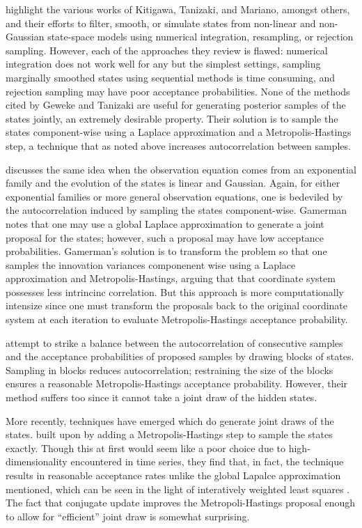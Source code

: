 \documentclass[11pt]{article}
\begin{document}
\cite{geweke-tanizaki-2001} highlight the various works of Kitigawa, Tanizaki,
and Mariano, amongst others, and their efforts to filter, smooth, or simulate
states from non-linear and non-Gaussian state-space models using numerical
integration, resampling, or rejection sampling.  However, each of the approaches
they review is flawed: numerical integration does not work well for any but the
simplest settings, sampling marginally smoothed states using sequential methods
is time consuming, and rejection sampling may have poor acceptance
probabilities.  None of the methods cited by Geweke and Tanizaki are useful for
generating posterior samples of the states jointly, an extremely desirable
property.  Their solution is to sample the states component-wise using a Laplace
approximation and a Metropolis-Hastings step, a technique that as noted above
increases autocorrelation between samples.

\cite{gamerman-1998} discusses the same idea when the observation equation comes
from an exponential family and the evolution of the states is linear and
Gaussian.  Again, for either exponential families or more general observation
equations, one is bedeviled by the autocorrelation induced by sampling the
states component-wise.  Gamerman notes that one may use a global Laplace
approximation to generate a joint proposal for the states; however, such a
proposal may have low acceptance probabilities.  Gamerman's solution is to
transform the problem so that one samples the innovation variances componenent
wise using a Laplace approximation and Metropolis-Hastings, arguing that that
coordinate system possesses less intrincinc correlation.  But this approach is
more computationally intensize since one must transform the proposals back to
the original coordinate system at each iteration to evaluate Metropolis-Hastings
acceptance probability.

\cite{shephard-pitt-1997} attempt to strike a balance between the
autocorrelation of consecutive samples and the acceptance probabilities of
proposed samples by drawing blocks of states.  Sampling in blocks reduces
autocorrelation; restraining the size of the blocks ensures a reasonable
Metropolis-Hastings acceptance probability.  However, their method suffers too
since it cannot take a joint draw of the hidden states.

More recently, techniques have emerged which do generate joint draws of the
states.  \cite{ravines-etal-2006} built upon \cite{west-etal-1985} by adding a
Metropolis-Hastings step to sample the states exactly.  Though this at first
would seem like a poor choice due to high-dimensionality encountered in time
series, they find that, in fact, the technique results in reasonable acceptance
rates unlike the global Lapalce approximation mentioned, which can be seen in
the light of interatively weighted least squares \citep{wedderburn-1974}.  The
fact that conjugate update improves the Metropoli-Hastings proposal enough to
allow for ``efficient'' joint draw is somewhat surprising.
\end{document}
